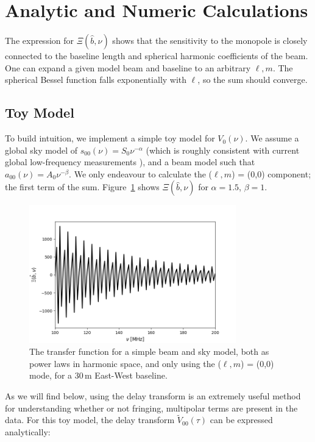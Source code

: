 \section{Analytic and Numeric Calculations}

The expression for $\Xi(\hat{b},\nu)$ shows that the sensitivity to the monopole is closely connected to the baseline length and spherical harmonic coefficients of the beam. One can expand a given model beam and baseline to an arbitrary $\ell, m$. The spherical Bessel function falls exponentially with $\ell$, so the sum should converge.

\subsection{Toy Model}
\label{subsec:toy_model}
To build intuition, we implement a simple toy model for $V_0(\nu)$. We assume a global sky model of $s_{00}(\nu) = S_0\nu^{-\alpha}$ (which is roughly consistent with current global low-frequency measurements \citealt{Mozden.17}), and a beam model such that $a_{00}(\nu) = A_0\nu^{-\beta}$. We only endeavour to calculate the ($\ell,m$) = (0,0) component; the first term of the sum. Figure~\ref{fig:xi_toy} shows $\Xi(\hat{b},\nu)$ for $\alpha=1.5$, $\beta = 1$. 

\begin{figure}
\centering
\includegraphics[width=0.8\textwidth]{chapters/global_signal/figures/xi_toy.png}
\caption[The transfer function for a simple beam and sky model.]{The transfer function for a simple beam and sky model, both as power laws in harmonic space, and only using the ($\ell,m$) = (0,0) mode, for a 30\,m East-West baseline.}
\label{fig:xi_toy}
\end{figure}

As we will find below, using the delay transform \citep{Parsons.12b} is an extremely useful method for understanding whether or not fringing, multipolar terms are present in the data. For this toy model, the delay transform $\tilde{V}_{00}(\tau)$ can be expressed analytically:

